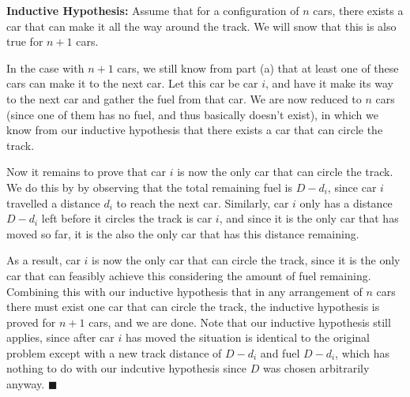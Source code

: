 \documentclass[11pt]{article}
\begin{document}
\begin{Parts}
\begin{solution}
      \textbf{Inductive Hypothesis:} Assume that for a configuration of $n$ cars, there exists a car that can make it all the way around the track. We will snow that this is also true for $n +1$ cars. 


      In the case with $n +1$ cars, we still know from part (a) that at least one of these cars can make it to the next car. Let this car be car $i$, and have it make its way to the next car and gather the fuel from that car. We are now reduced to $n$ cars (since one of them has no fuel, and thus basically doesn't exist), in which we know from our inductive hypothesis that there exists a car that can circle the track. 

      Now it remains to prove that car $i$ is now the only car that can circle the track. We do this by by observing that the total remaining fuel is $D - d_i$, since car $i$ travelled a distance $d_i$ to reach the next car. Similarly, car $i$ only has a distance $D - d_i$ left before it circles the track is car $i$, and since it is the only car that has moved so far, it is the also the only car that has this distance remaining. 
      
      As a result, car $i$ is now the only car that can circle the track, since it is the only car that can feasibly achieve this considering the amount of fuel remaining. Combining this with our inductive hypothesis that in any arrangement of $n$ cars there must exist one car that can circle the track, the inductive hypothesis is proved for $n+1$ cars, and we are done. Note that our inductive hypothesis still applies, since after car $i$ has moved the situation is identical to the original problem except with a new track distance of $D - d_i$ and fuel $D - d_i$, which has nothing to do with our indcutive hypothesis since $D$ was chosen arbitrarily anyway. $\blacksquare$


      

\end{solution}
\end{Parts}
\end{document}
